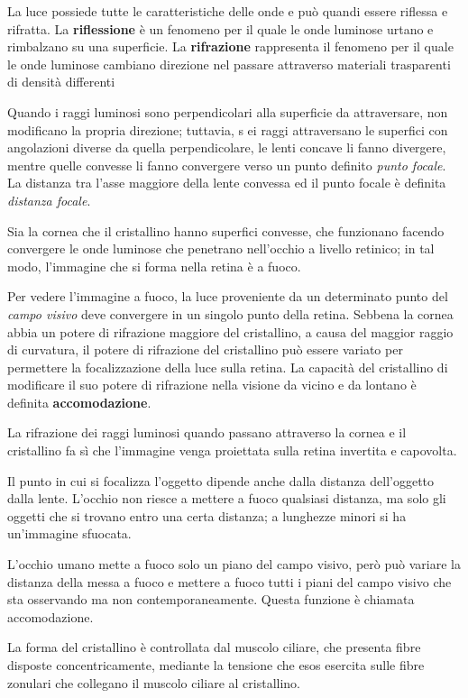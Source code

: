 \documentclass[]{article}
\begin{document}
La luce possiede tutte le caratteristiche delle onde e può quandi essere
riflessa e rifratta. La \textbf{riflessione} è un fenomeno per il quale
le onde luminose urtano e rimbalzano su una superficie. La
\textbf{rifrazione} rappresenta il fenomeno per il quale le onde
luminose cambiano direzione nel passare attraverso materiali trasparenti
di densità differenti

Quando i raggi luminosi sono perpendicolari alla superficie da
attraversare, non modificano la propria direzione; tuttavia, s ei raggi
attraversano le superfici con angolazioni diverse da quella
perpendicolare, le lenti concave li fanno divergere, mentre quelle
convesse li fanno convergere verso un punto definito \emph{punto
focale}. La distanza tra l'asse maggiore della lente convessa ed il
punto focale è definita \emph{distanza focale}.

Sia la cornea che il cristallino hanno superfici convesse, che
funzionano facendo convergere le onde luminose che penetrano nell'occhio
a livello retinico; in tal modo, l'immagine che si forma nella retina è
a fuoco.

Per vedere l'immagine a fuoco, la luce proveniente da un determinato
punto del \emph{campo visivo} deve convergere in un singolo punto della
retina. Sebbena la cornea abbia un potere di rifrazione maggiore del
cristallino, a causa del maggior raggio di curvatura, il potere di
rifrazione del cristallino può essere variato per permettere la
focalizzazione della luce sulla retina. La capacità del cristallino di
modificare il suo potere di rifrazione nella visione da vicino e da
lontano è definita \textbf{accomodazione}.

La rifrazione dei raggi luminosi quando passano attraverso la cornea e
il cristallino fa sì che l'immagine venga proiettata sulla retina
invertita e capovolta.

Il punto in cui si focalizza l'oggetto dipende anche dalla distanza
dell'oggetto dalla lente. L'occhio non riesce a mettere a fuoco
qualsiasi distanza, ma solo gli oggetti che si trovano entro una certa
distanza; a lunghezze minori si ha un'immagine sfuocata.

L'occhio umano mette a fuoco solo un piano del campo visivo, però può
variare la distanza della messa a fuoco e mettere a fuoco tutti i piani
del campo visivo che sta osservando ma non contemporaneamente. Questa
funzione è chiamata accomodazione.

La forma del cristallino è controllata dal muscolo ciliare, che presenta
fibre disposte concentricamente, mediante la tensione che esos esercita
sulle fibre zonulari che collegano il muscolo ciliare al cristallino.
\end{document}
